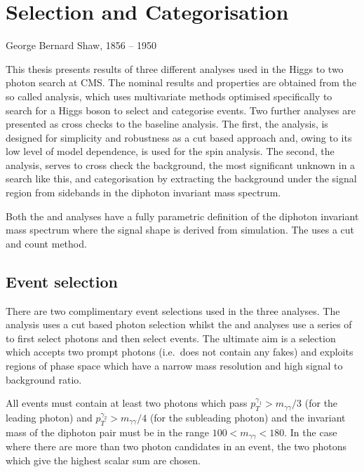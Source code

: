 \chapter{Selection and Categorisation}
\label{chap:selection_and_categorisation}
{George Bernard Shaw, 1856 -- 1950}

This thesis presents results of three different analyses used in the Higgs to two photon search at CMS. The nominal results and properties are obtained from the so called \MFM analysis, which uses multivariate methods optimised specifically to search for a \SM Higgs boson to select and categorise events. Two further analyses are presented as cross checks to the baseline \MFM analysis. The first, the \CiC analysis, is designed for simplicity and robustness as a cut based approach and, owing to its low level of model dependence, is used for the spin analysis. The second, the \SMVA analysis, serves to cross check the background, the most significant unknown in a search like this, and categorisation by extracting the background under the signal region from sidebands in the diphoton invariant mass spectrum.

Both the \CiC and \MFM analyses have a fully parametric definition of the diphoton invariant mass spectrum where the signal shape is derived from \MC simulation. The \SMVA uses a cut and count method. 


\section{Event selection}
\label{sec:event_selection}

There are two complimentary event selections used in the three analyses. The \CiC analysis uses a cut based photon selection whilst the \MFM and \SMVA analyses use a series of \BDTs to first select photons and then select events. The ultimate aim is a selection which accepts two prompt photons (i.e.\ does not contain any fakes) and exploits regions of phase space which have a narrow mass resolution and high signal to background ratio.

All events must contain at least two photons which pass $p_{T}^{\gamma_{1}}>m_{\gamma\gamma}/3$ (for the leading photon) and $p_{T}^{\gamma_{2}}>m_{\gamma\gamma}/4$ (for the subleading photon) and the invariant mass of the diphoton pair must be in the range $100<m_{\gamma\gamma}<180$. In the case where there are more than two photon candidates in an event, the two photons which give the highest scalar sum \pT are chosen. 

